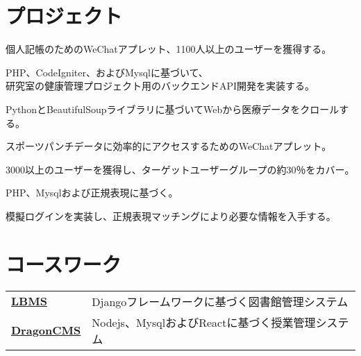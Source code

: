 \documentclass[]{deedy-resume-openfont}
\begin{document}
\begin{minipage}[t]{0.73\textwidth}

\section{プロジェクト}

\begin{tightemize}
    \item 個人記帳のためのWeChatアプレット、1100人以上のユーザーを獲得する。
    \end{tightemize}
\sectionsep

\begin{tightemize}
    \item PHP、CodeIgniter、およびMysqlに基づいて、\\ 研究室の健康管理プロジェクト用のバックエンドAPI開発を実装する。
    \item PythonとBeautifulSoupライブラリに基づいてWebから医療データをクロールする。
    \end{tightemize}
\sectionsep

\begin{tightemize}
    \item スポーツパンチデータに効率的にアクセスするためのWeChatアプレット。
    \item 3000以上のユーザーを獲得し、ターゲットユーザーグループの約30％をカバー。
    \item PHP、Mysqlおよび正規表現に基づく。
    \item 模擬ログインを実装し、正規表現マッチングにより必要な情報を入手する。
    \end{tightemize}




\section{コースワーク}

\begin{tabular}{ll}
\href{https://github.com/vinci7/LBMS-by-Django}{\bf LBMS} & Djangoフレームワークに基づく図書館管理システム \\
\href{https://coding.net/u/vinchi/p/DragonCMS}{\bf DragonCMS} & Nodejs、MysqlおよびReactに基づく授業管理システム\\
\end{tabular}


\end{minipage}
\end{document}
